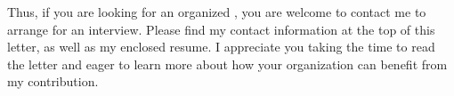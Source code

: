Thus, if you are looking for an organized \role, you are welcome to contact me to arrange for an interview. Please find my contact information at the top of this letter, as well as my enclosed resume. I appreciate you taking the time to read the letter and eager to learn more about how your organization can benefit from my contribution.